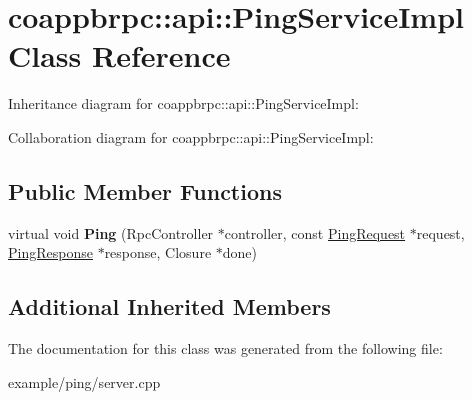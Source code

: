 \hypertarget{classcoappbrpc_1_1api_1_1PingServiceImpl}{}\section{coappbrpc\+:\+:api\+:\+:Ping\+Service\+Impl Class Reference}
\label{classcoappbrpc_1_1api_1_1PingServiceImpl}


Inheritance diagram for coappbrpc\+:\+:api\+:\+:Ping\+Service\+Impl\+:


Collaboration diagram for coappbrpc\+:\+:api\+:\+:Ping\+Service\+Impl\+:
\subsection*{Public Member Functions}
\begin{DoxyCompactItemize}
\item 
\mbox{\label{classcoappbrpc_1_1api_1_1PingServiceImpl_ad0fdead8e69607ba9114b277fe96844b}} 
virtual void {\bfseries Ping} (Rpc\+Controller $\ast$controller, const \hyperlink{classcoappbrpc_1_1api_1_1PingRequest}{Ping\+Request} $\ast$request, \hyperlink{classcoappbrpc_1_1api_1_1PingResponse}{Ping\+Response} $\ast$response, Closure $\ast$done)
\end{DoxyCompactItemize}
\subsection*{Additional Inherited Members}


The documentation for this class was generated from the following file\+:\begin{DoxyCompactItemize}
\item 
example/ping/server.\+cpp\end{DoxyCompactItemize}
